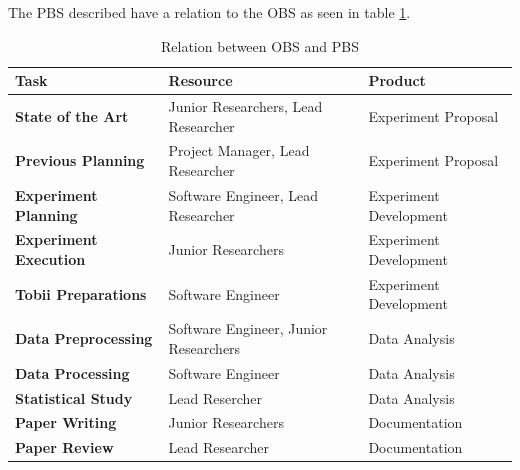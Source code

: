 The PBS described have a relation to the OBS as seen in table \ref{tab:rel_OBS_PBS}.
\begin{table}[H]
    \centering
    \caption{Relation between OBS and PBS}
    \label{tab:rel_OBS_PBS}
    \begin{tabularx}{\textwidth}{|>{\raggedright\arraybackslash}X|>{\raggedright\arraybackslash}X|>{\raggedright\arraybackslash}X|}
        \hline
        \textbf{Task} & \textbf{Resource} & \textbf{Product} \\
        \hline
        \textbf{State of the Art} & Junior Researchers, Lead Researcher & Experiment Proposal \\
        \hline
        \textbf{Previous Planning} & Project Manager, Lead Researcher & Experiment Proposal \\
        \hline
        \textbf{Experiment Planning} & Software Engineer, Lead Researcher & Experiment Development \\
        \hline
        \textbf{Experiment Execution} & Junior Researchers & Experiment Development \\
        \hline
        \textbf{Tobii Preparations} & Software Engineer & Experiment Development \\
        \hline
        \textbf{Data Preprocessing} & Software Engineer, Junior Researchers & Data Analysis \\
        \hline
        \textbf{Data Processing} & Software Engineer & Data Analysis \\
        \hline
        \textbf{Statistical Study} & Lead Resercher & Data Analysis \\
        \hline
        \textbf{Paper Writing} & Junior Researchers & Documentation \\
        \hline
        \textbf{Paper Review} & Lead Researcher  & Documentation \\
        \hline
    \end{tabularx}
\end{table}

